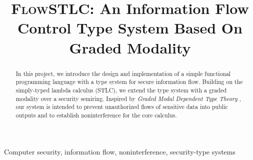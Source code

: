 \documentclass[conference]{IEEEtran}
\begin{document}
\title{\textsc{FlowSTLC}: An Information Flow Control Type System Based On Graded Modality
}

\author{
\and
{}
\and
{}
}

\maketitle

\begin{abstract}
In this project, we introduce the design and implementation of a simple functional programming language with a type system for secure information flow. Building on the simply-typed lambda calculus (STLC), we extend the type system with a graded modality over a security semiring. Inspired by \textit{Graded Modal Dependent Type Theory} \cite{moon2021graded}, our system is intended to prevent unauthorized flows of sensitive data into public outputs and to establish noninterference \cite{smith2007principles} for the core calculus.
\end{abstract}

\begin{IEEEkeywords}
Computer security, information flow, noninterference, security-type systems
\end{IEEEkeywords}
\end{document}

